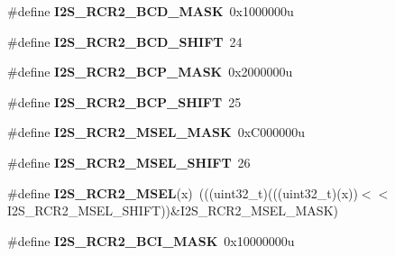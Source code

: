 \begin{DoxyCompactItemize}
\item 
\#define {\bfseries I2\+S\+\_\+\+R\+C\+R2\+\_\+\+B\+C\+D\+\_\+\+M\+A\+SK}~0x1000000u\hypertarget{group__I2S__Register__Masks_gada87418ab4529692585474e6586d0dc2}{}\label{group__I2S__Register__Masks_gada87418ab4529692585474e6586d0dc2}

\item 
\#define {\bfseries I2\+S\+\_\+\+R\+C\+R2\+\_\+\+B\+C\+D\+\_\+\+S\+H\+I\+FT}~24\hypertarget{group__I2S__Register__Masks_ga13a6f638b14d217719d05d50e7d010ed}{}\label{group__I2S__Register__Masks_ga13a6f638b14d217719d05d50e7d010ed}

\item 
\#define {\bfseries I2\+S\+\_\+\+R\+C\+R2\+\_\+\+B\+C\+P\+\_\+\+M\+A\+SK}~0x2000000u\hypertarget{group__I2S__Register__Masks_ga2131afd85c44b3770c4f13aa313255d7}{}\label{group__I2S__Register__Masks_ga2131afd85c44b3770c4f13aa313255d7}

\item 
\#define {\bfseries I2\+S\+\_\+\+R\+C\+R2\+\_\+\+B\+C\+P\+\_\+\+S\+H\+I\+FT}~25\hypertarget{group__I2S__Register__Masks_ga5ab6e46c9fe897adc5d9205c5eed1af4}{}\label{group__I2S__Register__Masks_ga5ab6e46c9fe897adc5d9205c5eed1af4}

\item 
\#define {\bfseries I2\+S\+\_\+\+R\+C\+R2\+\_\+\+M\+S\+E\+L\+\_\+\+M\+A\+SK}~0x\+C000000u\hypertarget{group__I2S__Register__Masks_gaedf6545e7c28305ad5d4b65a439db838}{}\label{group__I2S__Register__Masks_gaedf6545e7c28305ad5d4b65a439db838}

\item 
\#define {\bfseries I2\+S\+\_\+\+R\+C\+R2\+\_\+\+M\+S\+E\+L\+\_\+\+S\+H\+I\+FT}~26\hypertarget{group__I2S__Register__Masks_gad12cb75f50dddf2a5364e04a0ec59b83}{}\label{group__I2S__Register__Masks_gad12cb75f50dddf2a5364e04a0ec59b83}

\item 
\#define {\bfseries I2\+S\+\_\+\+R\+C\+R2\+\_\+\+M\+S\+EL}(x)~(((uint32\+\_\+t)(((uint32\+\_\+t)(x))$<$$<$I2\+S\+\_\+\+R\+C\+R2\+\_\+\+M\+S\+E\+L\+\_\+\+S\+H\+I\+FT))\&I2\+S\+\_\+\+R\+C\+R2\+\_\+\+M\+S\+E\+L\+\_\+\+M\+A\+SK)\hypertarget{group__I2S__Register__Masks_gae884163868d00afe144cc15cfd48936b}{}\label{group__I2S__Register__Masks_gae884163868d00afe144cc15cfd48936b}

\item 
\#define {\bfseries I2\+S\+\_\+\+R\+C\+R2\+\_\+\+B\+C\+I\+\_\+\+M\+A\+SK}~0x10000000u\hypertarget{group__I2S__Register__Masks_ga38210c72a39c29ee6ce38ff654c471cb}{}\label{group__I2S__Register__Masks_ga38210c72a39c29ee6ce38ff654c471cb}


\end{DoxyCompactItemize}
